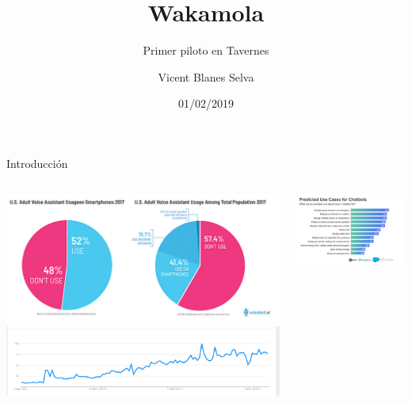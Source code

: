 \documentclass[bigger]{beamer}
\title{Wakamola}
\subtitle{Primer piloto en Tavernes}
\author[IBIME]{Vicent Blanes Selva}
\date{01/02/2019}
\begin{document}
	\begin{frame}
		\titlepage
	\end{frame}

\begin{frame}{Introducción}
\begin{columns}[T]
	\begin{column}[T]{6cm}
		\includegraphics[scale=0.35]{img/usage1}
		\includegraphics[scale=0.30]{img/usage4}
		
	\end{column}
	\begin{column}[T]{5.5cm}
		\raggedright
		\includegraphics[scale=0.3]{img/usage3}
	\end{column}
\end{columns}	
\end{frame}
\end{document}
